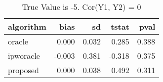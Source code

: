 \begin{table}[h!]

\caption{True Value is -5. Cor(Y1, Y2) = 0}
\centering
\begin{tabular}[t]{lrrrr}
\toprule
algorithm & bias & sd & tstat & pval\\
\midrule
oracle & 0.000 & 0.032 & 0.285 & 0.388\\
ipworacle & -0.003 & 0.381 & -0.318 & 0.375\\
proposed & 0.000 & 0.038 & 0.492 & 0.311\\
\bottomrule
\end{tabular}
\end{table}
